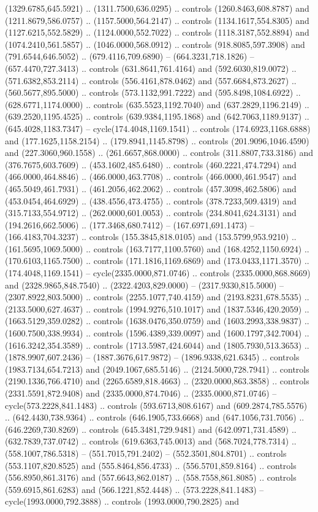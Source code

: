 (1329.6785,645.5921) .. (1311.7500,636.0295) .. controls (1260.8463,608.8787) and (1211.8679,586.0757) .. (1157.5000,564.2147) .. controls (1134.1617,554.8305) and (1127.6215,552.5829) .. (1124.0000,552.7022) .. controls (1118.3187,552.8894) and (1074.2410,561.5857) .. (1046.0000,568.0912) .. controls (918.8085,597.3908) and (791.6544,646.5052) .. (679.4116,709.6890) -- (664.3231,718.1826) -- (657.4470,727.3413) .. controls (631.8641,761.4164) and (592.6030,819.0072) .. (571.6382,853.2114) .. controls (556.4161,878.0462) and (557.6684,873.2627) .. (560.5677,895.5000) .. controls (573.1132,991.7222) and (595.8498,1084.6922) .. (628.6771,1174.0000) .. controls (635.5523,1192.7040) and (637.2829,1196.2149) .. (639.2520,1195.4525) .. controls (639.9384,1195.1868) and (642.7063,1189.9137) .. (645.4028,1183.7347) -- cycle(174.4048,1169.1541) .. controls (174.6923,1168.6888) and (177.1625,1158.2154) .. (179.8941,1145.8798) .. controls (201.9096,1046.4590) and (227.3060,960.1558) .. (261.6657,868.0000) .. controls (311.8807,733.3186) and (376.7675,603.7609) .. (453.1602,485.6480) .. controls (460.2221,474.7294) and (466.0000,464.8846) .. (466.0000,463.7708) .. controls (466.0000,461.9547) and (465.5049,461.7931) .. (461.2056,462.2062) .. controls (457.3098,462.5806) and (453.0454,464.6929) .. (438.4556,473.4755) .. controls (378.7233,509.4319) and (315.7133,554.9712) .. (262.0000,601.0053) .. controls (234.8041,624.3131) and (194.2616,662.5006) .. (177.3468,680.7412) -- (167.6971,691.1473) -- (166.4183,704.3237) .. controls (155.3845,818.0105) and (153.5799,953.9210) .. (161.5695,1069.5000) .. controls (163.7177,1100.5760) and (168.4252,1150.6924) .. (170.6103,1165.7500) .. controls (171.1816,1169.6869) and (173.0433,1171.3570) .. (174.4048,1169.1541) -- cycle(2335.0000,871.0746) .. controls (2335.0000,868.8669) and (2328.9865,848.7540) .. (2322.4203,829.0000) -- (2317.9330,815.5000) -- (2307.8922,803.5000) .. controls (2255.1077,740.4159) and (2193.8231,678.5535) .. (2133.5000,627.4637) .. controls (1994.9276,510.1017) and (1837.5346,420.2059) .. (1663.5129,359.0282) .. controls (1638.0476,350.0759) and (1603.2993,338.9837) .. (1600.7500,338.9934) .. controls (1596.4389,339.0097) and (1600.1797,342.7004) .. (1616.3242,354.3589) .. controls (1713.5987,424.6044) and (1805.7930,513.3653) .. (1878.9907,607.2436) -- (1887.3676,617.9872) -- (1896.9338,621.6345) .. controls (1983.7134,654.7213) and (2049.1067,685.5146) .. (2124.5000,728.7941) .. controls (2190.1336,766.4710) and (2265.6589,818.4663) .. (2320.0000,863.3858) .. controls (2331.5591,872.9408) and (2335.0000,874.7046) .. (2335.0000,871.0746) -- cycle(573.2228,841.1483) .. controls (593.6713,808.6167) and (609.2874,785.5576) .. (642.4430,738.9364) .. controls (646.1905,733.6668) and (647.1056,731.7056) .. (646.2269,730.8269) .. controls (645.3481,729.9481) and (642.0971,731.4589) .. (632.7839,737.0742) .. controls (619.6363,745.0013) and (568.7024,778.7314) .. (558.1007,786.5318) -- (551.7015,791.2402) -- (552.3501,804.8701) .. controls (553.1107,820.8525) and (555.8464,856.4733) .. (556.5701,859.8164) .. controls (556.8950,861.3176) and (557.6643,862.0187) .. (558.7558,861.8085) .. controls (559.6915,861.6283) and (566.1221,852.4448) .. (573.2228,841.1483) -- cycle(1993.0000,792.3888) .. controls (1993.0000,790.2825) and 